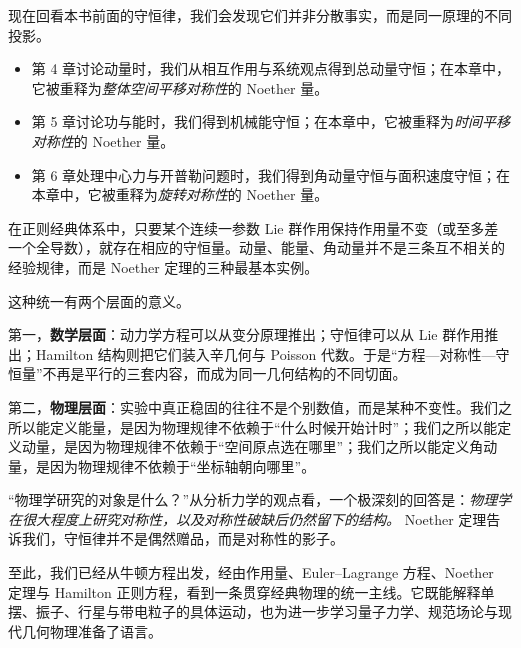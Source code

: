 现在回看本书前面的守恒律，我们会发现它们并非分散事实，而是同一原理的不同投影。

\begin{itemize}
  \item 第 4 章讨论动量时，我们从相互作用与系统观点得到总动量守恒；在本章中，它被重释为\emph{整体空间平移对称性}的 Noether 量。
  \item 第 5 章讨论功与能时，我们得到机械能守恒；在本章中，它被重释为\emph{时间平移对称性}的 Noether 量。
  \item 第 6 章处理中心力与开普勒问题时，我们得到角动量守恒与面积速度守恒；在本章中，它被重释为\emph{旋转对称性}的 Noether 量。
\end{itemize}

\begin{law}[守恒律的统一图景]
在正则经典体系中，只要某个连续一参数 Lie 群作用保持作用量不变（或至多差一个全导数），就存在相应的守恒量。动量、能量、角动量并不是三条互不相关的经验规律，而是 Noether 定理的三种最基本实例。
\end{law}

这种统一有两个层面的意义。

第一，\textbf{数学层面}：动力学方程可以从变分原理推出；守恒律可以从 Lie 群作用推出；Hamilton 结构则把它们装入辛几何与 Poisson 代数。于是“方程—对称性—守恒量”不再是平行的三套内容，而成为同一几何结构的不同切面。

第二，\textbf{物理层面}：实验中真正稳固的往往不是个别数值，而是某种不变性。我们之所以能定义能量，是因为物理规律不依赖于“什么时候开始计时”；我们之所以能定义动量，是因为物理规律不依赖于“空间原点选在哪里”；我们之所以能定义角动量，是因为物理规律不依赖于“坐标轴朝向哪里”。

\begin{remark}
“物理学研究的对象是什么？”从分析力学的观点看，一个极深刻的回答是：\emph{物理学在很大程度上研究对称性，以及对称性破缺后仍然留下的结构。} Noether 定理告诉我们，守恒律并不是偶然赠品，而是对称性的影子。
\end{remark}

至此，我们已经从牛顿方程出发，经由作用量、Euler--Lagrange 方程、Noether 定理与 Hamilton 正则方程，看到一条贯穿经典物理的统一主线。它既能解释单摆、振子、行星与带电粒子的具体运动，也为进一步学习量子力学、规范场论与现代几何物理准备了语言。